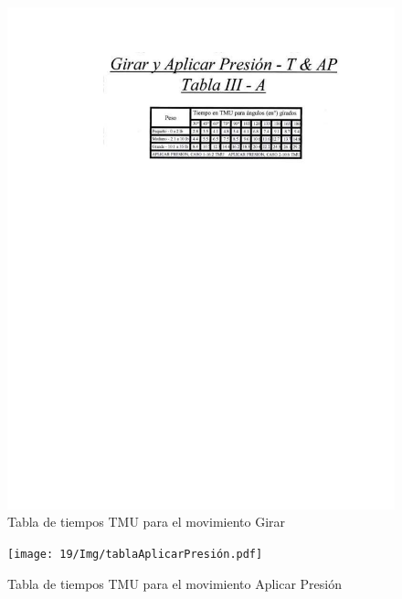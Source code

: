     \begin{figure}[H]
        \centering
        \includegraphics[trim = {42mm 190mm 42mm 24mm},clip,scale=0.6]{19/Img/tablaGirar.pdf}
        \caption{Tabla de tiempos TMU para el movimiento Girar}
        \label{fig:tablaGirar}
    \end{figure}
\begin{figure}[H]
        \centering
        \texttt{[image: 19/Img/tablaAplicarPresión.pdf]}
        \caption{Tabla de tiempos TMU para el movimiento Aplicar Presión}
        \label{fig:tablaAplicarPresión}
    \end{figure}
